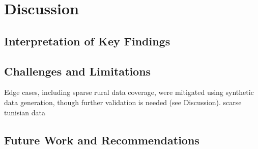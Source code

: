\documentclass[12pt,a4paper,oneside,english]{book}
\begin{document}
{\section{Discussion}
\label{sec:discussion}

    \subsection{Interpretation of Key Findings}
    \label{subsec:interpretation}

    \subsection{Challenges and Limitations}
    \label{subsec:challenges}
Edge cases, including sparse rural data coverage, were mitigated using synthetic data generation, though further validation is needed (see Discussion).
scarse tunisian data

    \subsection{Future Work and Recommendations}
    \label{subsec:future_work}




}
\end{document}

